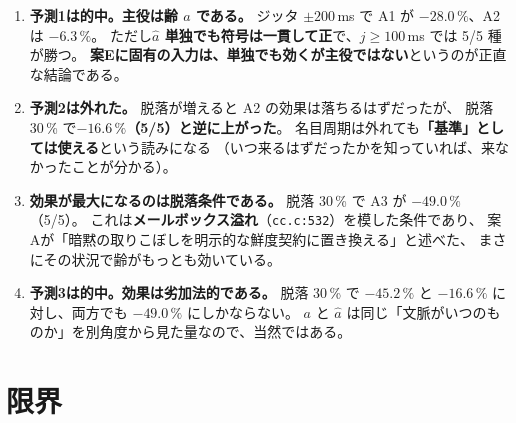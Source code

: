 \documentclass[11pt,a4paper]{article}
\newcommand{\code}[1]{\texttt{#1}}
\newcommand{\prob}[1]{\textbf{\textcolor{red!55!black}{#1}}}
\newcommand{\keyp}[1]{\textbf{\textcolor{blue!45!black}{#1}}}
\begin{document}
\begin{enumerate}[leftmargin=1.8em,itemsep=4pt]
  \item \keyp{予測1は的中。主役は齢 $a$ である。}
        ジッタ $\pm200$\,ms で A1 が $-28.0\,\%$、A2 は $-6.3\,\%$。
        ただし\keyp{$\hat a$ 単独でも符号は一貫して正}で、$j\ge100$\,ms では 5/5 種が勝つ。
        \keyp{案Eに固有の入力は、単独でも効くが主役ではない}というのが正直な結論である。
  \item \prob{予測2は外れた。} 脱落が増えると A2 の効果は落ちるはずだったが、
        脱落 30\,\% で\keyp{$-16.6\,\%$（5/5）と逆に上がった}。
        名目周期は外れても\keyp{「基準」としては使える}という読みになる
        （いつ来るはずだったかを知っていれば、来なかったことが分かる）。
  \item \keyp{効果が最大になるのは脱落条件である。}
        脱落 30\,\% で A3 が $-49.0\,\%$（5/5）。
        これは\keyp{メールボックス溢れ}（\code{cc.c:532}）を模した条件であり、
        案Aが「暗黙の取りこぼしを明示的な鮮度契約に置き換える」と述べた、
        まさにその状況で齢がもっとも効いている。
  \item \keyp{予測3は的中。効果は劣加法的である。}
        脱落 30\,\% で $-45.2\,\%$ と $-16.6\,\%$ に対し、両方でも $-49.0\,\%$ にしかならない。
        $a$ と $\hat a$ は同じ「文脈がいつのものか」を別角度から見た量なので、当然ではある。
\end{enumerate}

\section{限界}
\end{document}
